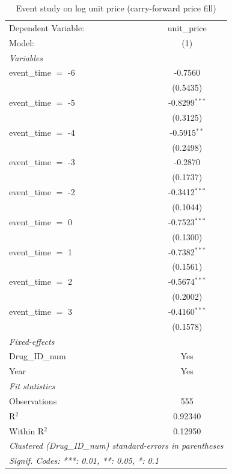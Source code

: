 
\begin{table}[htbp]
   \caption{Event study on log unit price (carry-forward price fill)}
   \centering
   \begin{tabular}{lc}
      \tabularnewline \midrule \midrule
      Dependent Variable: & unit\_price\\   
      Model:              & (1)\\  
      \midrule
      \emph{Variables}\\
      event\_time $=$ -6  & -0.7560\\   
                          & (0.5435)\\   
      event\_time $=$ -5  & -0.8299$^{***}$\\   
                          & (0.3125)\\   
      event\_time $=$ -4  & -0.5915$^{**}$\\   
                          & (0.2498)\\   
      event\_time $=$ -3  & -0.2870\\   
                          & (0.1737)\\   
      event\_time $=$ -2  & -0.3412$^{***}$\\   
                          & (0.1044)\\   
      event\_time $=$ 0   & -0.7523$^{***}$\\   
                          & (0.1300)\\   
      event\_time $=$ 1   & -0.7382$^{***}$\\   
                          & (0.1561)\\   
      event\_time $=$ 2   & -0.5674$^{***}$\\   
                          & (0.2002)\\   
      event\_time $=$ 3   & -0.4160$^{***}$\\   
                          & (0.1578)\\   
      \midrule
      \emph{Fixed-effects}\\
      Drug\_ID\_num       & Yes\\  
      Year                & Yes\\  
      \midrule
      \emph{Fit statistics}\\
      Observations        & 555\\  
      R$^2$               & 0.92340\\  
      Within R$^2$        & 0.12950\\  
      \midrule \midrule
      \multicolumn{2}{l}{\emph{Clustered (Drug\_ID\_num) standard-errors in parentheses}}\\
      \multicolumn{2}{l}{\emph{Signif. Codes: ***: 0.01, **: 0.05, *: 0.1}}\\
   \end{tabular}
\end{table}


